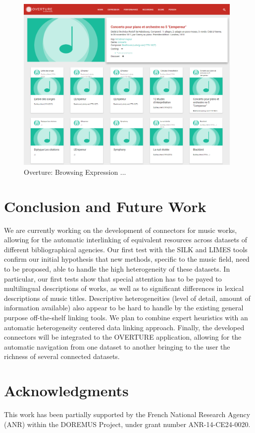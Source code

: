 \documentclass[runningheads,a4paper]{llncs}
\begin{document}
\begin{figure}
  \centering
  \includegraphics[width=11cm]{img/overture-detail.png}
  \caption{Overture: Browsing Expression ...}
  \label{fig:overture-detail}
\end{figure}



\section{Conclusion and Future Work}
\label{sec:conclusion}
We are currently working on the development of connectors for music works, allowing for the automatic interlinking of equivalent resources across datasets of different bibliographical agencies. Our first test with the SILK \cite{jentzsch2010silk} and LIMES \cite{ngomo2011limes} tools confirm our initial hypothesis that new methods, specific to the music field, need to be proposed, able to handle the high heterogeneity of these datasets. In particular, our first tests show that special attention has to be payed to multilingual descriptions of works, as well as to significant differences in lexical descriptions of music titles. Descriptive heterogeneities (level of detail, amount of information available) also appear to be hard to handle by the existing general purpose off-the-shelf linking tools. We plan to combine expert heuristics with an automatic heterogeneity centered data linking approach. Finally, the developed connectors will be integrated to the OVERTURE application, allowing for the automatic navigation from one dataset to another bringing to the user the richness of several connected datasets.

\section*{Acknowledgments}
This work has been partially supported by the French National Research Agency (ANR) within the DOREMUS Project, under grant number ANR-14-CE24-0020.



\end{document}
